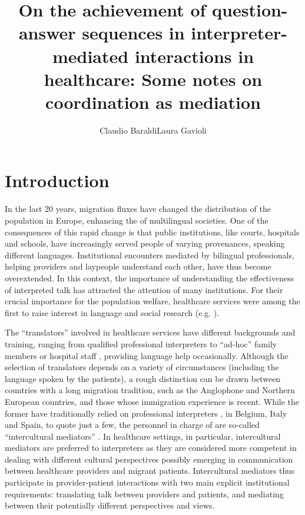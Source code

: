 \documentclass[output=paper]{LSP/langsci}
\title{On the achievement of question-answer sequences in interpreter-mediated interactions in healthcare: Some notes on coordination as mediation}
\author{Claudio Baraldi\lastand Laura Gavioli\affiliation{University of Modena and Reggio Emilia, Italy}}
\begin{document}
\section{Introduction}

In the last 20 years, migration fluxes have changed the distribution of the population in Europe, enhancing the  of multilingual societies. One of the consequences of this rapid change is that public institutions, like courts, hospitals and schools, have increasingly served people of varying provenances, speaking different languages. Institutional encounters mediated by bilingual professionals, helping providers and laypeople understand each other, have thus become overextended.  In this context, the importance of understanding the effectiveness of interpreted talk  has attracted the attention of many institutions. For their crucial importance for the population welfare, healthcare services were among the first to  raise interest in language and social research (e.g. \citealt{Angelelli2004Medical, Baraldi2007, Bolden2000, Davidson2000, Hsieh2007, Tebble1999, ValeroGarces2008}).

The ``translators'' involved in healthcare services have different backgrounds and training, ranging from qualified professional interpreters to ``ad-hoc'' family members or hospital staff \citep{Buhrig2004, Meyer2002}, providing language help occasionally. Although the selection of translators depends on a variety of circumstances (including the language spoken by the patients), a rough distinction can be drawn between countries with a long migration tradition, such as the Anglophone and Northern European countries, and those whose immigration experience is recent. While the former have traditionally relied on professional interpreters \citep{Carr1997, Corsellis2008, Hale2007, Roberts2000}, in Belgium, Italy and Spain, to quote just a few, the personnel in charge of  are so-called ``intercultural mediators'' \citep{Lizana2012, Merlini2009, Pittarello2009, Verrept2012}. In  healthcare settings, in particular, intercultural mediators are preferred to interpreters as they are considered more competent in dealing with different cultural perspectives possibly emerging in communication between healthcare providers and migrant patients. Intercultural mediators thus participate in provider-patient interactions with two main explicit institutional requirements: translating talk between providers and patients, and mediating between their potentially different perspectives and views. 
\end{document}

